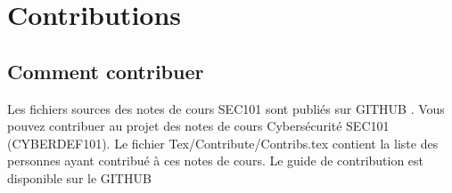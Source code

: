 
\section{Contributions}

\subsection{Comment contribuer}

Les fichiers sources des notes de cours  SEC101 sont publiés sur GITHUB  . Vous pouvez contribuer au projet des notes de cours Cybersécurité SEC101 (CYBERDEF101). Le fichier Tex/Contribute/Contribs.tex contient la liste des personnes ayant contribué à ces notes de cours.
Le guide de contribution est disponible sur le GITHUB

